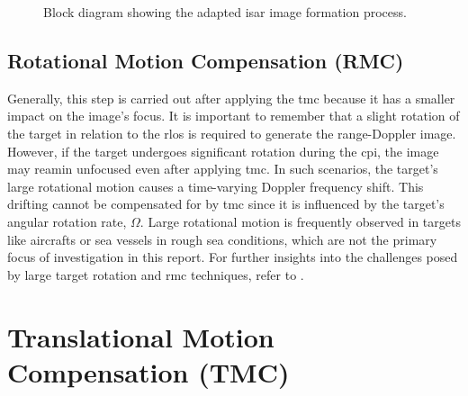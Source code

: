 \documentclass[class=report,11pt,crop=false]{standalone}
\begin{document}
    \begin{figure}[h]
        \centering
        \resizebox{\linewidth}{!}{}
        \caption{Block diagram showing the adapted \gls{isar} image formation process. \label{fig:theory_image_formation}}
    \end{figure}
       
    \subsection{Rotational Motion Compensation (RMC)} %
    
    Generally, this step is carried out after applying the \gls{tmc} because it has a smaller impact on the image's focus. It is important to remember that a slight rotation of the target in relation to the \gls{rlos} is required to generate the range-Doppler image. However, if the target undergoes significant rotation during the \gls{cpi}, the image may reamin unfocused even after applying \gls{tmc}. In such scenarios, the target's large rotational motion causes a time-varying Doppler frequency shift. This drifting cannot be compensated for by \gls{tmc} since it is influenced by the target's angular rotation rate, $\Omega$. Large rotational motion is frequently observed in targets like aircrafts or sea vessels in rough sea conditions, which are not the primary focus of investigation in this report. For further insights into the challenges posed by large target rotation and \gls{rmc} techniques, refer to \cite{ISARtextbook_Martorella,ISARtextbook_Matlab}.

\section{Translational Motion Compensation (TMC)}
\end{document}
